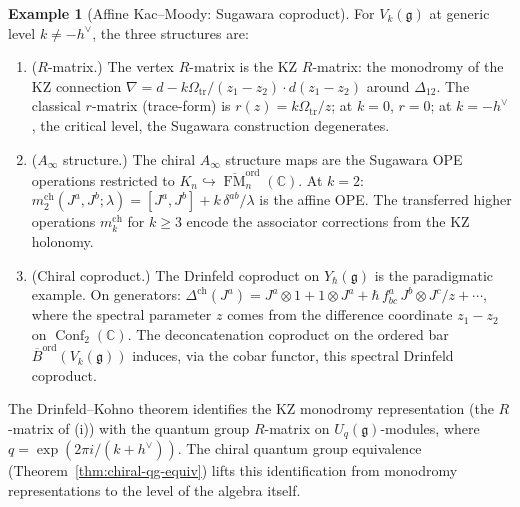 \documentclass[11pt,reqno]{amsart}
\theoremstyle{definition}
\newtheorem{example}[theorem]{Example}
\theoremstyle{remark}
\newcommand{\Ainf}{A_{\infty}}
\DeclareMathOperator{\Conf}{Conf}
\DeclareMathOperator{\FM}{FM}
\newcommand{\fg}{\mathfrak{g}}
\newcommand{\Barord}{\overline{B}^{\mathrm{ord}}}
\newcommand{\CC}{\mathbb{C}}
\numberwithin{equation}{section}
\begin{document}
\begin{example}[Affine Kac--Moody: Sugawara coproduct]
\label{ex:km-coproduct}
For $V_k(\fg)$ at generic level $k \neq -h^\vee$, the three
structures are:
\begin{enumerate}[label=\textup{(\roman*)}]
\item \textup{($R$-matrix.)} The vertex $R$-matrix is the
  KZ $R$-matrix: the monodromy of the KZ connection
  $\nabla = d - k\Omega_{\mathrm{tr}}/(z_1 - z_2) \cdot d(z_1 - z_2)$
  around $\Delta_{12}$. The classical $r$-matrix
  (trace-form) is
  $r(z) = k\Omega_{\mathrm{tr}}/z$; at $k = 0$, $r = 0$; at
  $k = -h^\vee$, the critical level, the Sugawara
  construction degenerates.
\item \textup{($\Ainf$ structure.)} The chiral $\Ainf$
  structure maps are the Sugawara OPE operations restricted
  to $K_n \hookrightarrow \overline{\FM}_n^{\mathrm{ord}}(\CC)$.
  At $k = 2$: $m_2^{\mathrm{ch}}(J^a, J^b; \lambda)
  = [J^a, J^b] + k\, \delta^{ab}/\lambda$ is the affine
  OPE. The transferred higher operations
  $m_k^{\mathrm{ch}}$ for $k \geq 3$ encode the
  associator corrections from the KZ holonomy.
\item \textup{(Chiral coproduct.)} The Drinfeld
  coproduct on $Y_\hbar(\fg)$ is the paradigmatic example.
  On generators: $\Delta^{\mathrm{ch}}(J^a) = J^a \otimes 1
  + 1 \otimes J^a + \hbar\, f^a_{bc}\, J^b \otimes J^c / z
  + \cdots$, where the spectral parameter $z$ comes from
  the difference coordinate $z_1 - z_2$ on
  $\Conf_2(\CC)$. The deconcatenation coproduct on the
  ordered bar $\Barord(V_k(\fg))$ induces, via the cobar
  functor, this spectral Drinfeld coproduct.
\end{enumerate}
The Drinfeld--Kohno theorem identifies the KZ monodromy
representation (the $R$-matrix of (i)) with the quantum
group $R$-matrix on $U_q(\fg)$-modules, where
$q = \exp(2\pi i / (k + h^\vee))$. The chiral quantum group
equivalence (Theorem~\ref{thm:chiral-qg-equiv}) lifts this
identification from monodromy representations to the level
of the algebra itself.
\end{example}
\end{document}
